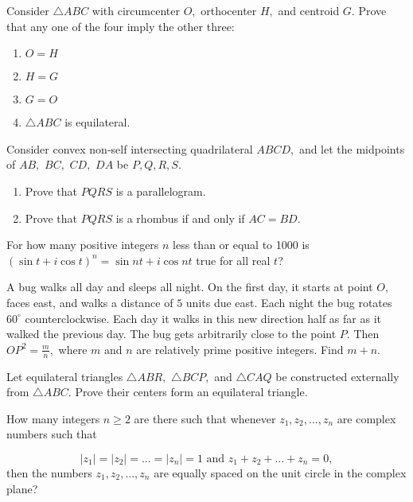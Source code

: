 \documentclass[mast]{lucky}
\begin{document}
\begin{prob}[]{2}
Consider $\triangle ABC$ with circumcenter $O,$ orthocenter $H,$ and centroid $G.$ Prove that any one of the four imply the other three:
    \begin{enumerate}
        \item $O=H$
        \item $H=G$
        \item $G=O$
        \item $\triangle ABC$ is equilateral.
    \end{enumerate}
\end{prob}

\begin{prob}[]{2}
Consider convex non-self intersecting quadrilateral $ABCD,$ and let the midpoints of $AB,$ $BC,$ $CD,$ $DA$ be $P,Q,R,S.$
    \begin{enumerate}
        \item Prove that $PQRS$ is a parallelogram.
        
        \item Prove that $PQRS$ is a rhombus if and only if $AC=BD.$
    \end{enumerate}
\end{prob}
    
\begin{prob}[AIME II 2005/9]{3}
For how many positive integers $n$ less than or equal to 1000 is $(\sin t + i \cos t)^n = \sin nt + i \cos nt$ true for all real $t$?
\end{prob}

\begin{prob}[AIME I 2020/8]{3}
A bug walks all day and sleeps all night. On the first day, it starts at point $O,$ faces east, and walks a distance of $5$ units due east. Each night the bug rotates $60^\circ$ counterclockwise. Each day it walks in this new direction half as far as it walked the previous day. The bug gets arbitrarily close to the point $P.$ Then $OP^2=\tfrac{m}{n},$ where $m$ and $n$ are relatively prime positive integers. Find $m+n.$
\end{prob}

\begin{prob}{3}
Let equilateral triangles $\triangle ABR,$ $\triangle BCP,$ and $\triangle CAQ$ be constructed externally from $\triangle ABC.$ Prove their centers form an equilateral triangle.
\end{prob}

\begin{req}[AMC 12B 2020/23]{3}
How many integers $n \geq 2$ are there such that whenever $z_1, z_2, ..., z_n$ are complex numbers such that

$$|z_1| = |z_2| = ... = |z_n| = 1 \text{    and    } z_1 + z_2 + ... + z_n = 0,$$
then the numbers $z_1, z_2, ..., z_n$ are equally spaced on the unit circle in the complex plane?
\end{req}
\end{document}
